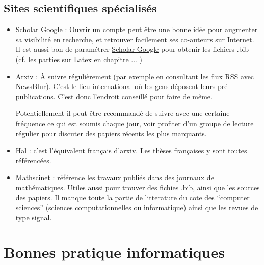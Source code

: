 \documentclass[a4paper,10pt]{book_ad}
\begin{document}
\section{Sites scientifiques spécialisés}



\begin{itemize}
\item \href{http://scholar.google.com}{Scholar Google} :
Ouvrir un compte peut être une bonne idée pour augmenter sa visibilité en recherche,
et retrouver facilement ses co-auteurs sur Internet.
Il est aussi bon de paramétrer \href{http://scholar.google.com}{Scholar Google} pour
obtenir les fichiers  .bib (cf. les parties sur Latex en chapitre ... )

\item \href{http://arxiv.org/}{Arxiv} :
À suivre régulièrement (par exemple en consultant les flux RSS avec \href{https://www.newsblur.com/}{NewsBlur}). 
C'est le lieu international
où les gens déposent leurs pré-publications. C'est donc l'endroit conseillé pour faire
de même.

Potentiellement il peut être recommandé de suivre avec une certaine fréquence ce qui est soumis
chaque jour, voir profiter d'un groupe de lecture régulier pour discuter des papiers récents les plus
marquants.

\item \href{http://hal.archives-ouvertes.fr/}{Hal} : c'est l'équivalent français d'arxiv.
Les thèses françaises y sont toutes référencées.


\item \href{http://www.ams.org/mathscinet/}{Mathscinet} : référence les travaux publiés dans
des journaux de mathématiques. Utiles aussi pour trouver des fichies .bib, ainsi que les sources
des papiers. Il manque toute la partie de litterature du cote des ``computer sciences'' (sciences
computationnelles ou informatique) ainsi que les revues de type signal.

\end{itemize}


\chapter{Bonnes pratique informatiques}
\minitoc
\end{document}
